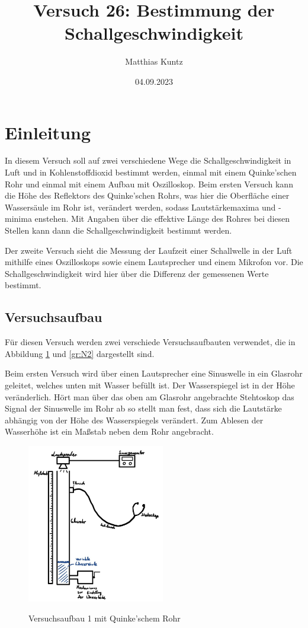 \documentclass{article}
\title{Versuch 26: Bestimmung der Schallgeschwindigkeit}
\author{Matthias Kuntz}
\date{04.09.2023}
\begin{document}
\maketitle

\section{Einleitung}

In diesem Versuch soll auf zwei verschiedene Wege die Schallgeschwindigkeit in Luft und in Kohlenstoffdioxid bestimmt werden, einmal mit einem Quinke’schen Rohr und einmal mit einem Aufbau mit Oszilloskop. Beim ersten Versuch kann die Höhe des Reflektors des Quinke'schen Rohrs, was hier die Oberfläche einer Wassersäule im Rohr ist, verändert werden, sodass Lautstärkemaxima und -minima enstehen. Mit Angaben über die effektive Länge des Rohres bei diesen Stellen kann dann die Schallgeschwindigkeit bestimmt werden.

Der zweite Versuch sieht die Messung der Laufzeit einer Schallwelle in der Luft mithilfe eines Oszilloskops sowie einem Lautsprecher und einem Mikrofon vor. Die Schallgeschwindigkeit wird hier über die Differenz der gemessenen Werte bestimmt.

\subsection{Versuchsaufbau}

Für diesen Versuch werden zwei verschiede Versuchsaufbauten verwendet, die in Abbildung \ref{gr:N1} und \ref{gr:N2} dargestellt sind.

Beim ersten Versuch wird über einen Lautsprecher eine Sinuswelle in ein Glasrohr geleitet, welches unten mit Wasser befüllt ist. Der Wasserspiegel ist in der Höhe veränderlich. Hört man über das oben am Glasrohr angebrachte Stehtoskop das Signal der Sinuswelle im Rohr ab so stellt man fest, dass sich die Lautstärke abhängig von der Höhe des Wasserspiegels verändert. Zum Ablesen der Wasserhöhe ist ein Maßstab neben dem Rohr angebracht.

\begin{figure}[h] 
\centering
\caption{Versuchsaufbau 1 mit Quinke'schem Rohr}
\includegraphics[width=6cm]{graphics/Skizze1.png} \label{gr:N1}
\end{figure}
\end{document}
